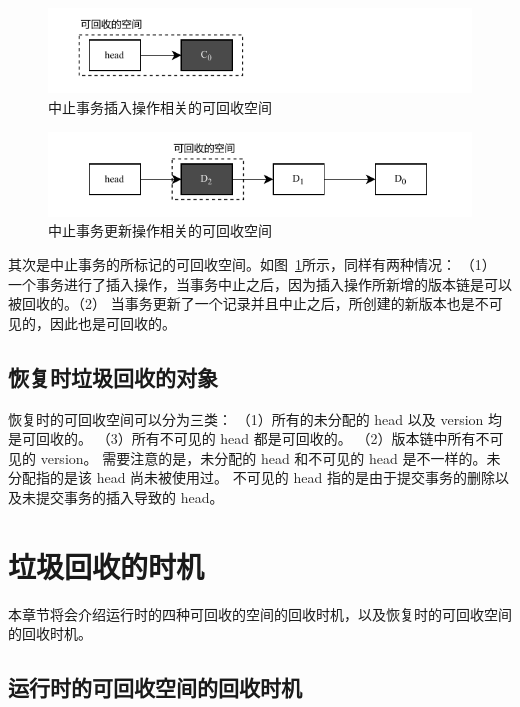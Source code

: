 \begin{figure}
    \centering
    \includegraphics[width=1\linewidth]{figures/gc-c.pdf}
    \caption{中止事务插入操作相关的可回收空间}
    \label{fig:space-abort}
\end{figure}

\begin{figure}
    \centering
    \includegraphics[width=1\linewidth]{figures/gc-d.pdf}
    \caption{中止事务更新操作相关的可回收空间}
    \label{fig:space-abort2}
\end{figure}

其次是中止事务的所标记的可回收空间。如图~\ref{fig:space-abort}所示，同样有两种情况：
（1） 一个事务进行了插入操作，当事务中止之后，因为插入操作所新增的版本链是可以被回收的。（2） 当事务更新了一个记录并且中止之后，所创建的新版本也是不可见的，因此也是可回收的。

\subsection{恢复时垃圾回收的对象}

恢复时的可回收空间可以分为三类：
（1）所有的未分配的 head 以及 version 均是可回收的。
（3）所有不可见的 head 都是可回收的。
（2）版本链中所有不可见的 version。
需要注意的是，未分配的 head 和不可见的 head 是不一样的。未分配指的是该 head 尚未被使用过。
不可见的 head 指的是由于提交事务的删除以及未提交事务的插入导致的 head。


\section{垃圾回收的时机}
\label{sec:time}

本章节将会介绍运行时的四种可回收的空间的回收时机，以及恢复时的可回收空间的回收时机。

\subsection{运行时的可回收空间的回收时机}

